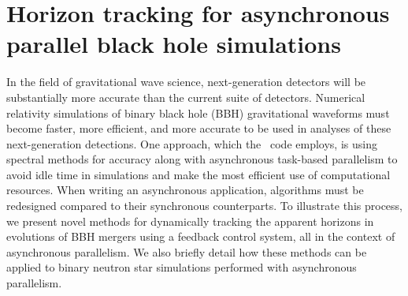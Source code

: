 \chapter{Horizon tracking for asynchronous parallel black hole simulations\label{ch:nelli_et_al}}


\begin{bibunit}[unsrtnat]



\noindent In the field of gravitational wave science, next-generation detectors will be
substantially more accurate than the current suite of detectors. Numerical
relativity simulations of binary black hole (BBH) gravitational waveforms must
become faster, more efficient, and more accurate to be used in analyses of
these next-generation detections. One approach, which the \spectre~code
employs, is using spectral methods for accuracy along with asynchronous
task-based parallelism to avoid idle time in simulations and make the most
efficient use of computational resources. When writing an asynchronous
application, algorithms must be redesigned compared to their synchronous
counterparts. To illustrate this process, we present novel methods for
dynamically tracking the apparent horizons in evolutions of BBH mergers using
a feedback control system, all in the context of asynchronous
parallelism.  We also briefly detail how these methods can be applied to binary
neutron star simulations performed with asynchronous parallelism.


\end{bibunit}
